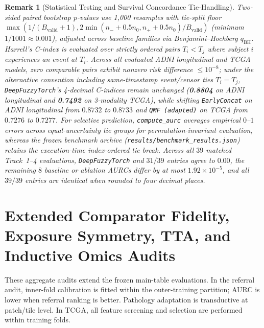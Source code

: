 \documentclass[10pt,twocolumn]{article}
\newtheorem{remark}{Remark}
\begin{document}
\begin{remark}[Statistical Testing and Survival Concordance Tie-Handling]
\label{rem:cindex_ties}
Two-sided paired bootstrap $p$-values use 1,000 resamples with tie-split floor
$\max(1/(B_{\text{valid}}+1), 2\min(n_- + 0.5 n_0, n_+ + 0.5 n_0)/B_{\text{valid}})$ (minimum
$1/1001 \approx 0.001$), adjusted across baseline families via Benjamini--Hochberg
$q_{\text{BH}}$. Harrell's C-index is evaluated over strictly ordered pairs $T_i < T_j$ where
subject $i$ experiences an event at $T_i$. Across all evaluated ADNI longitudinal and TCGA
models, zero comparable pairs exhibit nonzero risk difference $\le 10^{-8}$; under the
alternative convention including same-timestamp event/censor ties $T_i = T_j$,
\texttt{DeepFuzzyTorch}'s 4-decimal C-indices remain unchanged (\textbf{0.8804} on ADNI
longitudinal and \textbf{0.7492} on 3-modality TCGA), while shifting \texttt{EarlyConcat} on
ADNI longitudinal from $0.8732$ to $0.8733$ and \texttt{QMF (adapted)} on TCGA from $0.7276$ to
$0.7277$.
For selective prediction, \texttt{compute\_aurc} averages empirical $0$--$1$ errors across
equal-uncertainty tie groups for permutation-invariant evaluation, whereas the frozen benchmark
archive (\texttt{results/benchmark\_results.json}) retains the execution-time index-ordered tie
break. Across all $39$ matched Track~1--4 evaluations, \texttt{DeepFuzzyTorch} and $31/39$
entries agree to $0.00$, the remaining $8$ baseline or ablation AURCs differ by at most
$1.92\times 10^{-5}$, and all $39/39$ entries are identical when rounded to four decimal
places.
\end{remark}

\section{Extended Comparator Fidelity, Exposure Symmetry, TTA, and Inductive Omics Audits}
\label{app:extended_audits}
These aggregate audits extend the frozen main-table evaluations. In the referral audit,
inner-fold calibration is fitted within the outer-training partition; AURC is lower when
referral
ranking is better. Pathology adaptation is transductive at patch/tile level. In TCGA, all
feature screening and selection are performed within training folds.
\end{document}
